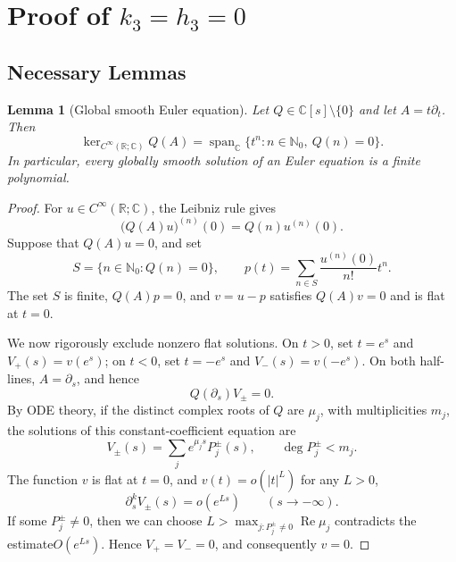 \documentclass[11pt,a4paper]{article}
\numberwithin{equation}{section}
\theoremstyle{journalplain}
\newtheorem{lemma}[theorem]{Lemma}
\theoremstyle{journaldef}
\begin{document}
\section{Proof of $k_3 = h_3 = 0$}
\subsection{Necessary Lemmas}

\begin{lemma}[Global smooth Euler equation]\label{lem:global-smooth-euler}
Let $Q\in\mathbb C[s]\setminus\{0\}$ and let $A=t\partial_t$. Then
\[
 \ker_{C^\infty(\mathbb R;\mathbb C)}Q(A)
 =\operatorname{span}_{\mathbb C}
   \{t^n:n\in\mathbb N_0,\ Q(n)=0\}.
\]
In particular, every globally smooth solution of an Euler equation is a
finite polynomial.
\end{lemma}

\begin{tcolorbox}[title={Proof of Lemma~\ref{lem:global-smooth-euler}},
  breakable
]
\begin{proof}
For $u\in C^\infty(\mathbb R;\mathbb C)$, the Leibniz rule gives
\[
 \bigl(Q(A)u\bigr)^{(n)}(0)=Q(n)u^{(n)}(0).
\]
Suppose that $Q(A)u=0$, and set
\[
 S=\{n\in\mathbb N_0:Q(n)=0\},
 \qquad
 p(t)=\sum_{n\in S}\frac{u^{(n)}(0)}{n!}t^n.
\]
The set $S$ is finite, $Q(A)p=0$, and $v=u-p$ satisfies $Q(A)v=0$ and is
flat at $t=0$.

We now rigorously exclude nonzero flat solutions. On $t>0$, set $t=e^s$
and $V_+(s)=v(e^s)$; on $t<0$, set $t=-e^s$ and
$V_-(s)=v(-e^s)$. On both half-lines, $A=\partial_s$, and hence
\[
 Q(\partial_s)V_\pm=0.
\]
By ODE theory, if the distinct complex roots of $Q$ are $\mu_j$, with multiplicities $m_j$, the solutions of this constant-coefficient equation are
\[
 V_\pm(s)=\sum_j e^{\mu_js}P_j^\pm(s),
 \qquad \deg P_j^\pm<m_j.
\]
The function $v$ is flat at $t = 0$, and
$v(t) = o(|t|^L)$ for any $L>0$,
\[
 \partial_s^kV_\pm(s)=o(e^{Ls})\qquad(s\to-\infty).
\]
If some $P_j^\pm\neq0$, then we can choose $L>\max_{j:P_j^\pm \neq 0}\operatorname{Re}\mu_j$ contradicts the estimate$O(e^{Ls})$. Hence $V_+=V_-=0$, and consequently $v=0$.
\end{proof}
\end{tcolorbox}
\end{document}

